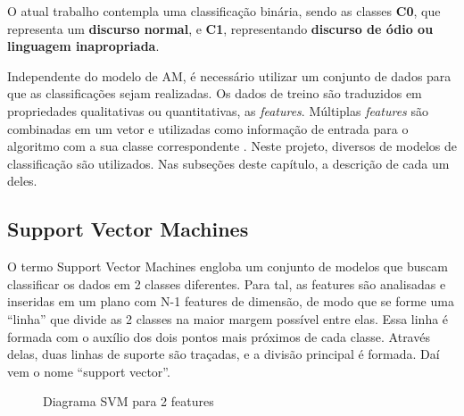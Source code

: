 O atual trabalho contempla uma classificação binária, sendo as classes \textbf{C0}, que representa um \textbf{discurso normal}, e \textbf{C1}, representando \textbf{discurso de ódio ou linguagem inapropriada}.

Independente do modelo de AM, é necessário utilizar um conjunto de dados para que as classificações sejam realizadas. Os dados de treino são traduzidos em propriedades qualitativas ou quantitativas, as \textit{features}. Múltiplas \textit{features} são combinadas em um vetor e utilizadas como informação de entrada para o algoritmo com a sua classe correspondente \cite{Lundborg_2017}. Neste projeto, diversos de modelos de classificação são utilizados. Nas subseções deste capítulo, a descrição de cada um deles.

\subsection{Support Vector Machines}

O termo Support Vector Machines engloba um conjunto de modelos que buscam classificar os dados em 2 classes diferentes. Para tal, as features são analisadas e inseridas em um plano com N-1 features de dimensão, de modo que se forme uma “linha” que divide as 2 classes na maior margem possível entre elas. Essa linha é formada com o auxílio dos dois pontos mais próximos de cada classe. Através delas, duas linhas de suporte são traçadas, e a divisão principal é formada. Daí vem o nome “support vector”.

\begin{figure}[!htb]
    \caption{\label{fig:my-label} Diagrama SVM para 2 features}
\end{figure}

